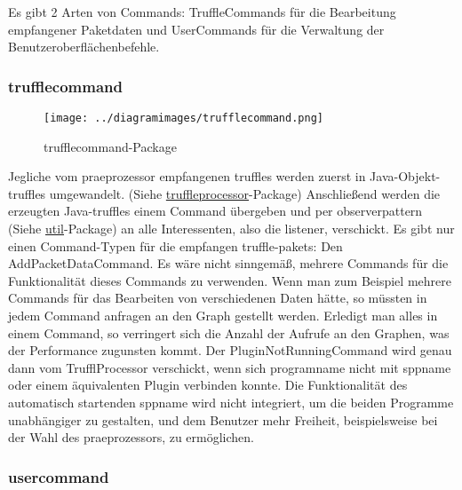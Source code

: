 Es gibt 2 Arten von Commands: TruffleCommands für die Bearbeitung empfangener
Paketdaten und UserCommands für die Verwaltung der Benutzeroberflächenbefehle.

      \subsubsection{trufflecommand}
      \label{subsubsec:trufflecommand}

      \begin{figure}[H]
        \centering
        \texttt{[image: ../diagramimages/trufflecommand.png]}
        \caption{trufflecommand-Package}
      \end{figure}

      \medskip
      Jegliche vom \gls{praeprozessor} empfangenen \glspl{truffle} werden zuerst in Java-Objekt-\glspl{truffle} umgewandelt. (Siehe
      \hyperref[subsubsec:truffleprocessor]{truffleprocessor}-Package) Anschließend
      werden die erzeugten Java-\glspl{truffle} einem Command übergeben und per \gls{observerpattern}
      (Siehe \hyperref[subsec:util]{util}-Package) an alle Interessenten, also die \gls{listener}, verschickt.
      \newline
      \newline
      Es gibt nur einen Command-Typen für die empfangen \gls{truffle}-\glspl{paket}: Den
      AddPacketDataCommand. Es wäre nicht sinngemäß, mehrere Commands für die Funktionalität
      dieses Commands zu verwenden. Wenn man zum Beispiel mehrere Commands für das Bearbeiten von
      verschiedenen Daten hätte, so müssten in jedem Command anfragen an den Graph gestellt werden.
      Erledigt man alles in einem Command, so verringert sich die Anzahl der Aufrufe an den Graphen,
      was der Performance zugunsten kommt.
      \newline
      \newline
      Der PluginNotRunningCommand wird genau dann vom TrufflProcessor verschickt, wenn sich \gls{programname} nicht mit \gls{sppname} oder einem äquivalenten Plugin verbinden konnte. Die Funktionalität des automatisch startenden \gls{sppname} wird nicht integriert, um die beiden Programme unabhängiger zu gestalten, und dem Benutzer mehr Freiheit, beispielsweise bei der Wahl des \gls{praeprozessor}s, zu ermöglichen.

      \subsubsection{usercommand}
      \label{subsubsec:usercommand}

